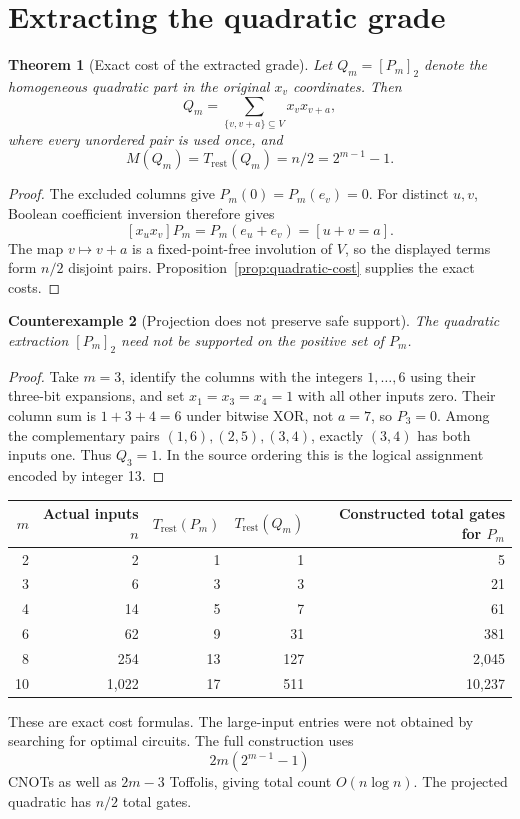 \documentclass[11pt,letterpaper,oneside]{report}
\theoremstyle{komorebi}
\newtheorem{theorem}{Theorem}[chapter]
\newtheorem{counterexample}[theorem]{Counterexample}
\newcommand{\KTrest}{T_{\mathrm{rest}}}
\begin{document}
\section{Extracting the quadratic grade}
\begin{theorem}[Exact cost of the extracted grade]\label{thm:grade-cost}
Let $Q_m=[P_m]_2$ denote the homogeneous quadratic part in the original $x_v$ coordinates. Then
\[
 Q_m=\sum_{\{v,v+a\}\subseteq V}x_vx_{v+a},
\]
where every unordered pair is used once, and
\[
 M(Q_m)=\KTrest(Q_m)=n/2=2^{m-1}-1.
\]
\end{theorem}
\begin{proof}
The excluded columns give $P_m(0)=P_m(e_v)=0$. For distinct $u,v$, Boolean coefficient inversion therefore gives
\[
 [x_ux_v]P_m=P_m(e_u+e_v)=[u+v=a].
\]
The map $v\mapsto v+a$ is a fixed-point-free involution of $V$, so the displayed terms form $n/2$ disjoint pairs. Proposition~\ref{prop:quadratic-cost} supplies the exact costs.
\end{proof}

\begin{counterexample}[Projection does not preserve safe support]\label{ce:unsafe}
The quadratic extraction $[P_m]_2$ need not be supported on the positive set of $P_m$.
\end{counterexample}
\begin{proof}
Take $m=3$, identify the columns with the integers $1,\ldots,6$ using their three-bit expansions, and set $x_1=x_3=x_4=1$ with all other inputs zero. Their column sum is $1+3+4=6$ under bitwise XOR, not $a=7$, so $P_3=0$. Among the complementary pairs $(1,6),(2,5),(3,4)$, exactly $(3,4)$ has both inputs one. Thus $Q_3=1$. In the source ordering this is the logical assignment encoded by integer 13.
\end{proof}

\begin{center}
\begin{tabular}{@{}rrrrr@{}}
\toprule
$m$ & Actual inputs $n$ & $\KTrest(P_m)$ & $\KTrest(Q_m)$ & Constructed total gates for $P_m$\\\midrule
2 & 2 & 1 & 1 & 5\\
3 & 6 & 3 & 3 & 21\\
4 & 14 & 5 & 7 & 61\\
6 & 62 & 9 & 31 & 381\\
8 & 254 & 13 & 127 & 2,045\\
10 & 1,022 & 17 & 511 & 10,237\\
\bottomrule
\end{tabular}
\end{center}
These are exact cost formulas. The large-input entries were not obtained by searching for optimal circuits. The full construction uses
\[
 2m(2^{m-1}-1)
\]
CNOTs as well as $2m-3$ Toffolis, giving total count $O(n\log n)$. The projected quadratic has $n/2$ total gates.
\end{document}
